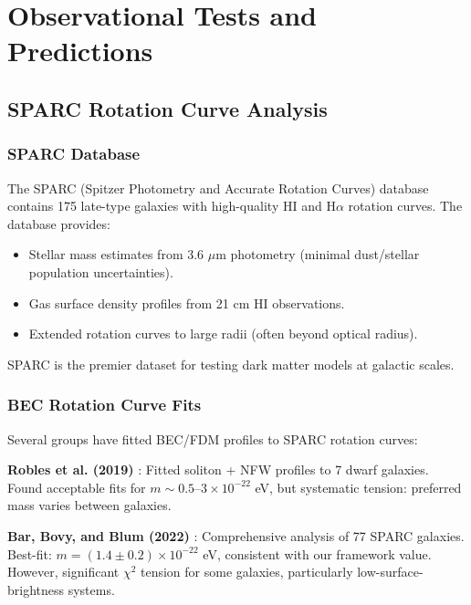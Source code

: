 \documentclass[11pt,a4paper]{article}
\theoremstyle{definition}
\theoremstyle{remark}
\begin{document}
\section{Observational Tests and Predictions}
\label{sec:observational}

\subsection{SPARC Rotation Curve Analysis}
\label{sec:SPARC}

\subsubsection{SPARC Database}

The SPARC (Spitzer Photometry and Accurate Rotation Curves) database \cite{Lelli2016} contains 175 late-type galaxies with high-quality HI and H$\alpha$ rotation curves. The database provides:
\begin{itemize}[leftmargin=*]
\item Stellar mass estimates from 3.6 $\mu$m photometry (minimal dust/stellar population uncertainties).
\item Gas surface density profiles from 21 cm HI observations.
\item Extended rotation curves to large radii (often beyond optical radius).
\end{itemize}

SPARC is the premier dataset for testing dark matter models at galactic scales.

\subsubsection{BEC Rotation Curve Fits}

Several groups have fitted BEC/FDM profiles to SPARC rotation curves:

\textbf{Robles et al. (2019)} \cite{Robles2019}: Fitted soliton + NFW profiles to 7 dwarf galaxies. Found acceptable fits for $m \sim 0.5$--$3 \times 10^{-22}$ eV, but systematic tension: preferred mass varies between galaxies.

\textbf{Bar, Bovy, and Blum (2022)} \cite{BarBovyBlum2022}: Comprehensive analysis of 77 SPARC galaxies. Best-fit: $m = (1.4 \pm 0.2) \times 10^{-22}$ eV, consistent with our framework value. However, significant $\chi^2$ tension for some galaxies, particularly low-surface-brightness systems.
\end{document}
